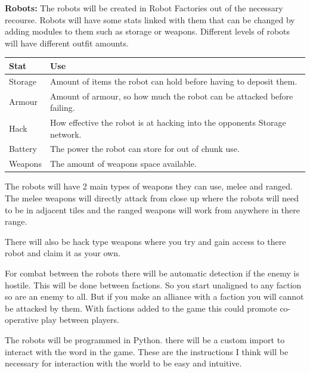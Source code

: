 \documentclass[12pt]{article}
\begin{document}
\textbf{Robots:}\newline
The robots will be created in Robot Factories out of the necessary recourse. Robots will have some stats linked with them that can be changed by adding modules to them such as storage or weapons. Different levels of robots will have different outfit amounts.

\begin{tabular}{l | l}
Stat & Use \\
\hline
Storage & Amount of items the robot can hold before having to deposit them. \\
Armour & Amount of armour, so how much the robot can be attacked before failing. \\
Hack & How effective the robot is at hacking into the opponents Storage  network.\\
Battery & The power the robot can store for out of chunk use. \\
Weapons & The amount of weapons space available. \\
\end{tabular}

The robots will have 2 main types of weapons they can use, melee and ranged. The melee weapons will directly attack from close up where the robots will need to be in adjacent tiles and the ranged weapons will work from anywhere in there range.

There will also be hack type weapons where you try and gain access to there robot and claim it as your own. 

For combat between the robots there will be automatic detection if the enemy is hostile. This will be done between factions. So you start unaligned to any faction so are an enemy to all. But if you make an alliance with a faction you will cannot be attacked by them. With factions added to the game this could promote co-operative play between players.

The robots will be programmed in Python. there will be a custom import to interact with the word in the game. These are the instructions I think will be necessary for interaction with the world to be easy and intuitive.
\end{document}
